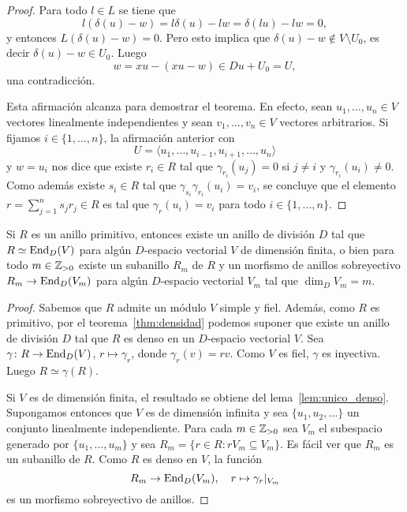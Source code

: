 \begin{proof}
	Para todo $l\in L$ se tiene que 
	\[
		l(\delta(u)-w)=l\delta(u)-lw=\delta(lu)-lw=0,
	\]
	y entonces $L(\delta(u)-w)=0$. Pero esto implica que $\delta(u)-w\not\in V\setminus U_0$, es
	decir $\delta(u)-w\in U_0$. Luego 
	\[
		w=xu-(xu-w)\in Du+U_0=U,
	\]
	una contradicción. 

	Esta afirmación alcanza para demostrar el teorema. En efecto, sean
	$u_1,\dots,u_n\in V$ vectores linealmente independientes y sean
	$v_1,\dots,v_n\in V$ vectores arbitrarios. Si fijamos $i\in\{1,\dots,n\}$, la afirmación anterior con
	\[
		U=\langle u_1,\dots,u_{i-1},u_{i+1},\dots,u_n\rangle
	\]
	y $w=u_i$ nos dice que existe $r_i\in R$ tal que $\gamma_{r_i}(u_j)=0$ si
	$j\ne i$ y $\gamma_{r_i}(u_i)\ne 0$. Como además existe $s_i\in R$ tal que
	$\gamma_{s_i}\gamma_{r_i}(u_i)=v_i$, se concluye que el elemento
	$r=\sum_{j=1}^n s_jr_j\in R$ es tal que $\gamma_r(u_i)=v_i$ para todo
	$i\in\{1,\dots,n\}$.
\end{proof}


\begin{corollary}
	Si $R$ es un anillo primitivo, entonces existe un anillo de división $D$
	tal que $R\simeq\operatorname{End}_D(V)$ para algún $D$-espacio vectorial $V$ de
	dimensión finita, o bien para todo $m\in\mathbb{Z}_{>0}$ existe un subanillo $R_m$ de
	$R$ y un morfismo de anillos sobreyectivo $R_m\to\operatorname{End}_D(V_m)$ para algún $D$-espacio
	vectorial $V_m$ tal que $\dim_DV_m=m$.
\end{corollary}

\begin{proof}
	Sabemos que $R$ admite un módulo $V$ simple y fiel. Además, como $R$ es
	primitivo, por el teorema~\ref{thm:densidad} podemos suponer que existe un
	anillo de división $D$ tal que $R$ es denso en un $D$-espacio vectorial
	$V$.  Sea $\gamma\colon R\to\operatorname{End}_D(V)$, $r\mapsto\gamma_r$, donde
	$\gamma_r(v)=rv$. Como $V$ es fiel, $\gamma$ es inyectiva. Luego
	$R\simeq\gamma(R)$. 

	Si $V$ es de dimensión finita, el resultado se obtiene del
	lema~\ref{lem:unico_denso}.  Supongamos entonces que $V$ es de dimensión
	infinita y sea $\{u_1,u_2,\dots\}$ un conjunto linealmente independiente.
	Para cada $m\in\mathbb{Z}_{>0}$ sea $V_m$ el subespacio generado por $\{u_1,\dots,u_m\}$
	y sea $R_m=\{r\in R:rV_m\subseteq V_m\}$. Es fácil ver que $R_m$ es un
	subanillo de $R$. Como $R$ es denso en $V$, la función
	\[
		R_m\to \operatorname{End}_D(V_m),\quad
		r\mapsto\gamma_r|_{V_m}
	\]
	es un morfismo sobreyectivo de anillos. 
\end{proof}

